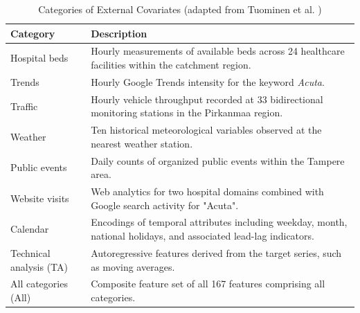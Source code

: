 \begin{table}[H]
\centering
\begin{tabularx}{\linewidth}{lX} 
\toprule
\textbf{Category} & \textbf{Description} \\
\midrule
Hospital beds & Hourly measurements of available beds across 24 healthcare facilities within the catchment region. \\
Trends & Hourly Google Trends intensity for the keyword \textit{Acuta}. \\
Traffic & Hourly vehicle throughput recorded at 33 bidirectional monitoring stations in the Pirkanmaa region. \\
Weather & Ten historical meteorological variables observed at the nearest weather station. \\
Public events & Daily counts of organized public events within the Tampere area. \\
Website visits & Web analytics for two hospital domains combined with Google search activity for "Acuta". \\
Calendar & Encodings of temporal attributes including weekday, month, national holidays, and associated lead-lag indicators. \\
Technical analysis (TA) & Autoregressive features derived from the target series, such as moving averages. \\
All categories (All) & Composite feature set of all 167 features comprising all categories. \\
\bottomrule
\end{tabularx}
\caption{Categories of External Covariates (adapted from Tuominen et al. \cite{tuominen_forecasting_2024})}
\label{tab:covariates}
\end{table}